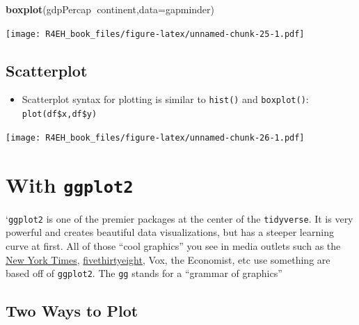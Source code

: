 \documentclass[]{book}
\newenvironment{Shaded}{\begin{snugshade}}{\end{snugshade}}
\newcommand{\KeywordTok}[1]{\textcolor[rgb]{0.13,0.29,0.53}{\textbf{#1}}}
\newcommand{\DataTypeTok}[1]{\textcolor[rgb]{0.13,0.29,0.53}{#1}}
\newcommand{\OperatorTok}[1]{\textcolor[rgb]{0.81,0.36,0.00}{\textbf{#1}}}
\newcommand{\NormalTok}[1]{#1}
\providecommand{\tightlist}{%
  \setlength{\itemsep}{0pt}\setlength{\parskip}{0pt}}
\theoremstyle{definition}
\theoremstyle{definition}
\theoremstyle{definition}
\theoremstyle{remark}
\begin{document}
\begin{Shaded}
\begin{Highlighting}[]
\KeywordTok{boxplot}\NormalTok{(gdpPercap}\OperatorTok{~}\NormalTok{continent,}\DataTypeTok{data=}\NormalTok{gapminder)}
\end{Highlighting}
\end{Shaded}

\texttt{[image: R4EH\_book\_files/figure-latex/unnamed-chunk-25-1.pdf]}

\subsection{Scatterplot}\label{scatterplot}

\begin{itemize}
\tightlist
\item
  Scatterplot syntax for plotting is similar to \texttt{hist()} and
  \texttt{boxplot()}: \texttt{plot(df\$x,df\$y)}
\end{itemize}

\begin{Shaded}
\end{Shaded}

\texttt{[image: R4EH\_book\_files/figure-latex/unnamed-chunk-26-1.pdf]}

\section{\texorpdfstring{With
\texttt{ggplot2}}{With ggplot2}}\label{with-ggplot2}

`\texttt{ggplot2} is one of the premier packages at the center of the
\texttt{tidyverse}. It is very powerful and creates beautiful data
visualizations, but has a steeper learning curve at first. All of those
``cool graphics'' you see in media outlets such as the
\href{https://archive.nytimes.com/www.nytimes.com/interactive/sports/football/2013-fantasy-football-tier-charts-QB.html}{New
York Times},
\href{https://fivethirtyeight.com/features/fastest-airlines-fastest-airports/}{fivethirtyeight},
Vox, the Economist, etc use something are based off of \texttt{ggplot2}.
The \texttt{gg} stands for a ``grammar of graphics''

\subsection{Two Ways to Plot}\label{two-ways-to-plot}
\end{document}
